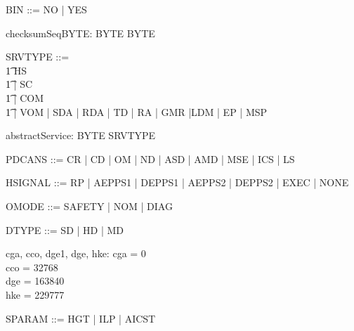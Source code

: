 \begin{zed}
BIN ::= NO | YES
\end{zed}

\begin{zed}
[BYTE]
\end{zed}

\begin{axdef}
checksumSeqBYTE: \seq BYTE \fun BYTE
\end{axdef}

\begin{zed}
SRVTYPE ::= \\
  \t1 HS \\
  \t1 | SC \\
  \t1 | COM \\
  \t1 | VOM | SDA | RDA | TD | RA | GMR
      |LDM | EP | MSP \also
\end{zed}


\begin{axdef}
abstractService: BYTE \pfun SRVTYPE
\end{axdef}

\begin{zed}
PDCANS ::= 
  CR | CD | OM | ND | ASD | AMD
  | MSE | ICS | LS
\end{zed}


\begin{zed}
HSIGNAL ::= RP | AEPPS1 | DEPPS1 | AEPPS2 | DEPPS2 | EXEC | NONE
\end{zed}

\begin{zed}
OMODE ::= SAFETY | NOM | DIAG
\end{zed}

\begin{zed}
DTYPE ::= SD | HD | MD %
\end{zed}

\begin{axdef}
cga, cco, dge1, dge, hke: \power \nat
\where
cga = 0  \\
cco = 32768  \\
dge = 163840  \\
hke = 229777 
\end{axdef}

\begin{zed}
SPARAM ::= HGT | ILP | AICST
\end{zed}

